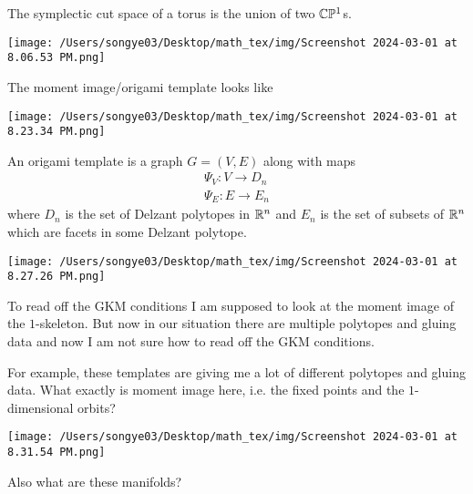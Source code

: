 \documentclass[12pt]{article}
\begin{document}
\begin{example}
    The symplectic cut space of a torus is the union of two $\mathbb{C}\mathbb{P}^1$s.
    \begin{center}
        \texttt{[image: /Users/songye03/Desktop/math\_tex/img/Screenshot 2024-03-01 at 8.06.53 PM.png]}
    \end{center}

    The moment image/origami template looks like \begin{center}
        \texttt{[image: /Users/songye03/Desktop/math\_tex/img/Screenshot 2024-03-01 at 8.23.34 PM.png]}
    \end{center}

\end{example}

\begin{definition}
    An origami template is a graph $G = (V,E)$ along with maps \begin{align*}
        \Psi_V:V \to D_n \\
        \Psi_E:E \to E_n
    \end{align*} where $D_n$ is the set of 
    Delzant polytopes in $\mathbb{R}^n$ and $E_n$ is the set of subsets of $\mathbb{R}^n$ which are
    facets in some Delzant polytope. 
\end{definition}

\begin{example}
\begin{center}
        \texttt{[image: /Users/songye03/Desktop/math\_tex/img/Screenshot 2024-03-01 at 8.27.26 PM.png]}
    \end{center}
\end{example}

To read off the GKM conditions I am supposed to look at the moment image of the $1$-skeleton. 
But now in our situation there are multiple polytopes and gluing data and now I 
am not sure how to read off the GKM conditions.

\begin{example}
    For example, these templates are giving me a lot of different polytopes and gluing data.
    What exactly is moment image here, i.e. the fixed points and the $1$-dimensional orbits?
    \begin{center}
        \texttt{[image: /Users/songye03/Desktop/math\_tex/img/Screenshot 2024-03-01 at 8.31.54 PM.png]}
    \end{center}
    Also what are these manifolds?
\end{example}
\end{document}
